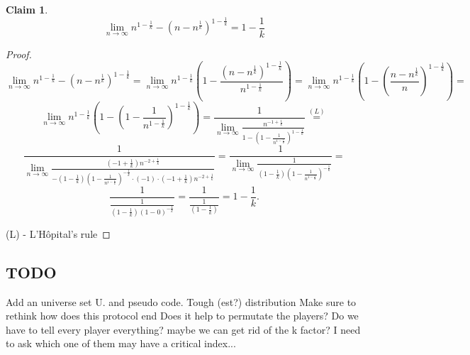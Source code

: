 \documentclass{article}
\theoremstyle{plain}
\newtheorem{claim}{Claim}
\begin{document}
\begin{claim}
\begin{equation*}
    \lim_{n \rightarrow \infty} n^{1-\frac{1}{k}} - \left( n - n^{\frac{1}{k}} \right)^{1-\frac{1}{k}} = 1-\frac{1}{k}
\end{equation*}
\end{claim}
\begin{proof}
$$\lim_{n \rightarrow \infty} n^{1-\frac{1}{k}} - \left( n - n^{\frac{1}{k}} \right)^{1-\frac{1}{k}} = 
\lim_{n \rightarrow \infty} n^{1-\frac{1}{k}} \left(1 - \frac{\left( n - n^{\frac{1}{k}} \right)^{1-\frac{1}{k}}}{n^{1-\frac{1}{k}}}\right) = 
\lim_{n \rightarrow \infty} n^{1-\frac{1}{k}}\left(1 - \left( \frac{n - n^{\frac{1}{k}} }{n}\right)^{1-\frac{1}{k}}\right) = $$ \newline
$$
\lim_{n \rightarrow \infty} n^{1-\frac{1}{k}}\left(1 - \left( 1 - \frac{1 }{n^{1-\frac{1}{k}}}\right)^{1-\frac{1}{k}}\right) =
\frac{1}{\lim_{n \rightarrow \infty} \frac{n^{-1+\frac{1}{k}}}{1 - \left( 1 - \frac{1 }{n^{1-\frac{1}{k}}}\right)^{1-\frac{1}{k}}}} \overset{(L)}{=} $$ \newline
$$\frac{1}{\lim_{n \rightarrow \infty} \frac{\left(-1+\frac{1}{k}\right)n^{-2+\frac{1}{k}}}{-\left(1-\frac{1}{k}\right) \left( 1 - \frac{1 }{n^{1-\frac{1}{k}}}\right)^{-\frac{1}{k}} \cdot (-1) \cdot \left(-1+\frac{1}{k}\right)n^{-2+\frac{1}{k}}}} =
\frac{1}{\lim_{n \rightarrow \infty} \frac{1}{\left(1-\frac{1}{k}\right) \left( 1 - \frac{1 }{n^{1-\frac{1}{k}}}\right)^{-\frac{1}{k}}}} =$$ \newline
$$
\frac{1}{\frac{1}{\left(1-\frac{1}{k}\right) \left( 1 - 0\right)^{-\frac{1}{k}}}} = \frac{1}{\frac{1}{\left(1-\frac{1}{k}\right)}} = 1-\frac{1}{k}. 
$$

(L) - L'Hôpital's rule
\end{proof}

\subsection{TODO}
Add an universe set U. and pseudo code. 
Tough (est?) distribution\newline
Make sure to rethink how does this protocol end \newline
Does it help to permutate the players? \newline
Do we have to tell every player everything? maybe we can get rid of the k factor? I need to ask which one of them may have a critical index... \newline
\end{document}
